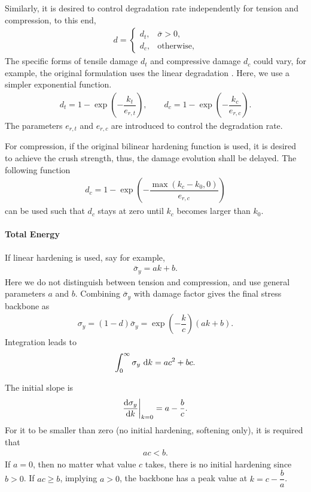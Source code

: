 Similarly, it is desired to control degradation rate independently for tension and compression, to this end,
\begin{gather}
d=\left\{
\begin{array}{ll}
d_t,&\bar{\sigma}>0,\\
d_c,&\text{otherwise},
\end{array}
\right.
\end{gather}
The specific forms of tensile damage $d_t$ and compressive damage $d_c$ could vary, for example, the original formulation \cite{Kenawy2020} uses the linear degradation \cite{Grassl2013}. Here, we use a simpler exponential function.
\begin{gather}
d_t=1-\exp\left(-\dfrac{k_t}{e_{r,t}}\right),\qquad
d_c=1-\exp\left(-\dfrac{k_c}{e_{r,c}}\right).
\end{gather}
The parameters $e_{r,t}$ and $e_{r,c}$ are introduced to control the degradation rate.

For compression, if the original bilinear hardening function  is used, it is desired to achieve the crush strength, thus, the damage evolution shall be delayed. The following function
\begin{gather*}
d_c=1-\exp\left(-\dfrac{\max\left(k_c-k_0,0\right)}{e_{r,c}}\right)
\end{gather*}
can be used such that $d_c$ stays at zero until $k_c$ becomes larger than $k_0$.
\paragraph{Total Energy}
If linear hardening is used, say for example,
\begin{gather}
\bar{\sigma}_y=ak+b.
\end{gather}
Here we do not distinguish between tension and compression, and use general parameters $a$ and $b$. Combining $\bar{\sigma}_y$ with damage factor gives the final stress backbone as
\begin{gather}
\sigma_y=\left(1-d\right)\bar{\sigma}_y=\exp\left(-\dfrac{k}{c}\right)\left(ak+b\right).
\end{gather}
Integration leads to
\begin{gather}
\int_{0}^{\infty}\sigma_y~\mathrm{d}k=ac^2+bc.
\end{gather}

The initial slope is
\begin{gather}
\dfrac{\mathrm{d}\sigma_y}{\mathrm{d}k}\bigg|_{k=0}=a-\dfrac{b}{c}.
\end{gather}
For it to be smaller than zero (no initial hardening, softening only), it is required that
\begin{gather}
ac<b.
\end{gather}
If $a=0$, then no matter what value $c$ takes, there is no initial hardening since $b>0$. If $ac\geqslant{}b$, implying $a>0$, the backbone has a peak value at $k=c-\dfrac{b}{a}$.

